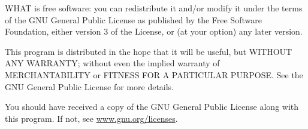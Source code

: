 \documentclass[WHATMANUAL.tex]{subfiles}
\begin{document}
WHAT is free software: you can redistribute it and/or modify it under the terms of the GNU General Public License as published by the Free Software Foundation, either version 3 of the License, or (at your option) any later version.

This program is distributed in the hope that it will be useful, but WITHOUT ANY WARRANTY; without even the implied warranty of MERCHANTABILITY or FITNESS FOR A PARTICULAR PURPOSE. See the GNU General Public License for more details.

You should have received a copy of the GNU General Public License along with this program. If not, see \url{www.gnu.org/licenses}.

\vspace{1cm}

%
%
%
%
\end{document}
